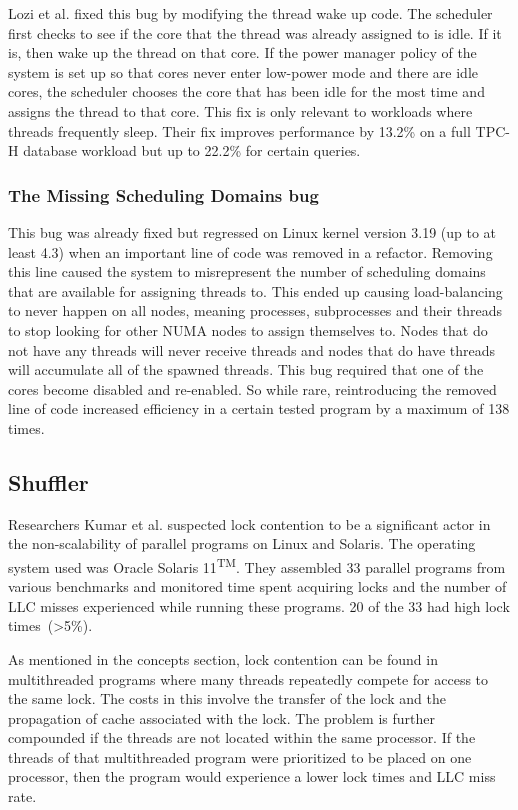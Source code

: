 \documentclass{sig-alternate}
\begin{document}
Lozi et al. fixed this bug by modifying the thread wake up code. The scheduler first checks to see if the core that the thread was already assigned to is idle. If it is, then wake up the thread on that core. If the power manager policy of the system is set up so that cores never enter low-power mode and there are idle cores, the scheduler chooses the core that has been idle for the most time and assigns the thread to that core. This fix is only relevant to workloads where threads frequently sleep. Their fix improves performance by 13.2\% on a full TPC-H database workload but up to 22.2\% for certain queries.~\cite{Lozi:2016}

\subsubsection{The Missing Scheduling Domains bug}
\label{sec:cfsfault_missingsched}

This bug was already fixed but regressed on Linux kernel version 3.19 (up to at least 4.3) when an important line of code was removed in a refactor. Removing this line caused the system to misrepresent the number of scheduling domains that are available for assigning threads to. This ended up causing load-balancing to never happen on all nodes, meaning processes, subprocesses and their threads to stop looking for other NUMA nodes to assign themselves to. Nodes that do not have any threads will never receive threads and nodes that do have threads will accumulate all of the spawned threads.
This bug required that one of the cores become disabled and re-enabled. So while rare, reintroducing the removed line of code increased efficiency in a certain tested program by a maximum of 138 times.~\cite{Lozi:2016}

\subsection{Shuffler}
\label{sec:shuffler}

Researchers Kumar et al. suspected lock contention to be a significant actor in the non-scalability of parallel programs on Linux and Solaris. The operating system used was Oracle Solaris 11\textsuperscript{TM}. They assembled 33 parallel programs from various benchmarks and monitored time spent acquiring locks and the number of LLC misses experienced while running these programs. 20 of the 33 had high lock times~(>5\%).

As mentioned in the concepts section, lock contention can be found in multithreaded programs where many threads repeatedly compete for access to the same lock. The costs in this involve the transfer of the lock and the propagation of cache associated with the lock. The problem is further compounded if the threads are not located within the same processor. If the threads of that multithreaded program were prioritized to be placed on one processor, then the program would experience a lower lock times and LLC miss rate.
\end{document}
